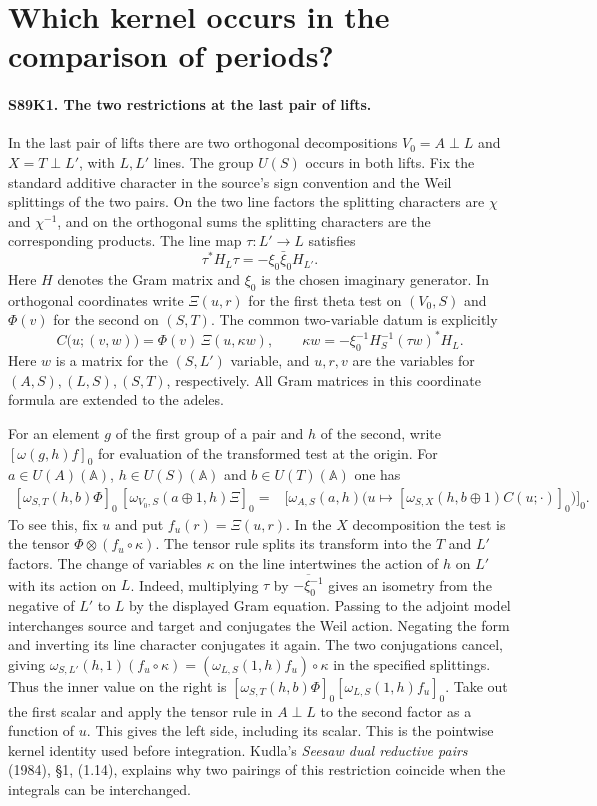 \section{Which kernel occurs in the comparison of periods?}

\paragraph{S89K1. The two restrictions at the last pair of lifts.}
In the last pair of lifts there are two orthogonal decompositions
$V_0=A\perp L$ and $X=T\perp L'$, with $L,L'$ lines. The group
$U(S)$ occurs in both lifts. Fix the standard additive character in the source's sign convention and
the Weil splittings of the two pairs. On the two line factors the
splitting characters are $\chi$ and $\chi^{-1}$, and on the orthogonal
sums the splitting characters are the corresponding products. The
line map $\tau:L'\to L$ satisfies
\[
       \tau^*H_L\tau=-\xi_0\bar\xi_0 H_{L'} .
\]
Here $H$ denotes the Gram matrix and $\xi_0$ is the chosen imaginary
generator. In orthogonal coordinates write $\Xi(u,r)$ for the first
theta test on $(V_0,S)$ and $\Phi(v)$ for the second on $(S,T)$.
The common two-variable datum is explicitly
\[
 C\bigl(u;(v,w)\bigr)=\Phi(v)\,\Xi(u,\kappa w),\qquad
 \kappa w=-\xi_0^{-1}H_S^{-1}(\tau w)^*H_L .
\]
Here $w$ is a matrix for the $(S,L')$ variable, and $u,r,v$ are the
variables for $(A,S),(L,S),(S,T)$, respectively. All Gram matrices
in this coordinate formula are extended to the adeles.

For an element $g$ of the first group of a pair and $h$ of the
second, write $[\omega(g,h)f]_0$ for evaluation of the transformed
test at the origin. For $a\in U(A)(\mathbb A)$,
$h\in U(S)(\mathbb A)$ and $b\in U(T)(\mathbb A)$ one has
\[
\begin{split}
 [\omega_{S,T}(h,b)\Phi]_0\,
 [\omega_{V_0,S}(a\oplus 1,h)\Xi]_0
 ={}&
 \bigl[\omega_{A,S}(a,h)\bigl(
 u\longmapsto
 [\omega_{S,X}(h,b\oplus 1) C(u;\cdot)]_0
 \bigr)\bigr]_0 .
\end{split}
\]
To see this, fix $u$ and put $f_u(r)=\Xi(u,r)$. In the $X$ decomposition
the test is the tensor $\Phi\otimes(f_u\circ\kappa)$. The tensor
rule splits its transform into the $T$ and $L'$ factors. The change
of variables $\kappa$ on the line intertwines the action of $h$
on $L'$ with its action on $L$. Indeed, multiplying $\tau$ by
$\overline{-\xi_0^{-1}}$ gives an isometry from the negative of
$L'$ to $L$ by the displayed Gram equation. Passing to the adjoint
model interchanges source and target and conjugates the Weil action.
Negating the form and inverting its line character conjugates it
again. The two conjugations cancel, giving
$\omega_{S,L'}(h,1)(f_u\circ\kappa)
 =(\omega_{L,S}(1,h)f_u)\circ\kappa$ in the specified splittings.
Thus the inner value on the right is
$[\omega_{S,T}(h,b)\Phi]_0[\omega_{L,S}(1,h)f_u]_0$.
Take out the first scalar and apply the tensor rule in
$A\perp L$ to the second factor as a function of $u$. This gives
the left side, including its scalar. This is the pointwise kernel
identity used before integration. Kudla's \emph{Seesaw dual reductive pairs} (1984), \S1,
(1.14), explains why two pairings of this restriction coincide when
the integrals can be interchanged.

